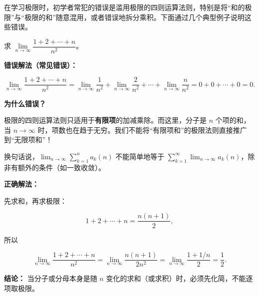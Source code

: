 \documentclass[fontset=fandol]{ctexart}
\begin{document}
在学习极限时，初学者常犯的错误是滥用极限的四则运算法则，特别是将“和的极限”与“极限的和”随意混用，或者错误地拆分乘积。下面通过几个典型例子说明这些错误。



\begin{example}[错误：滥用极限的四则运算法则]

求 \(\lim\limits_{n\to\infty} \dfrac{1 + 2 + \cdots + n}{n^2}\)。



\textbf{错误解法（常见错误）：}

\[

\lim_{n\to\infty} \dfrac{1 + 2 + \cdots + n}{n^2} = \lim_{n\to\infty} \dfrac{1}{n^2} + \lim_{n\to\infty} \dfrac{2}{n^2} + \cdots + \lim_{n\to\infty} \dfrac{n}{n^2} = 0 + 0 + \cdots + 0 = 0.

\]



\textbf{为什么错误？}



极限的四则运算法则只适用于\textbf{有限项}的加减乘除。而这里，分子是 \(n\) 个项的和，当 \(n \to \infty\) 时，项数也在趋于无穷。我们不能将“有限项和”的极限法则直接推广到“无限项和”！



换句话说，\(\lim_{n\to\infty} \sum_{k=1}^{n} a_k(n)\) 不能简单地等于 \(\sum_{k=1}^{\infty} \lim_{n\to\infty} a_k(n)\)，除非有额外的条件（如一致收敛）。



\textbf{正确解法：}

先求和，再求极限：

\[

1 + 2 + \cdots + n = \dfrac{n(n+1)}{2},

\]

所以

\[

\lim_{n\to\infty} \dfrac{1 + 2 + \cdots + n}{n^2} = \lim_{n\to\infty} \dfrac{n(n+1)}{2n^2} = \lim_{n\to\infty} \dfrac{1 + 1/n}{2} = \dfrac{1}{2}.

\]



\textbf{结论：} 当分子或分母本身是随 \(n\) 变化的求和（或求积）时，必须先化简，不能逐项取极限。

\end{example}
\end{document}
